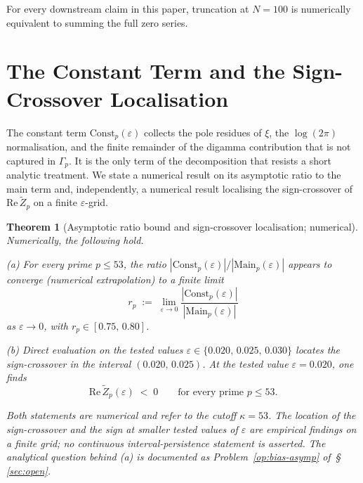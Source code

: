 \documentclass[11pt]{article}
\newtheorem{theorem}{Theorem}[section]
\newcommand{\Zt}{\widetilde{Z}}
\begin{document}
For every downstream claim in this paper, truncation at $N=100$ is
numerically equivalent to summing the full zero series.

\section{The Constant Term and the Sign-Crossover Localisation}
\label{sec:const}

The constant term $\mathrm{Const}_p(\varepsilon)$ collects the pole
residues of $\xi$, the $\log(2\pi)$ normalisation, and the finite
remainder of the digamma contribution that is not captured in
$\Gamma_p$.
It is the only term of the decomposition that resists a short analytic
treatment.
We state a numerical result on its asymptotic ratio to the main term
and, independently, a numerical result localising the sign-crossover
of $\mathrm{Re}\,\Zt_p$ on a finite $\varepsilon$-grid.

\begin{theorem}[Asymptotic ratio bound and sign-crossover localisation; numerical]
\label{thm:ratio-signcross}
Numerically, the following hold.

\emph{(a)} For every prime $p\le 53$, the ratio
$|\mathrm{Const}_p(\varepsilon)|/|\mathrm{Main}_p(\varepsilon)|$
appears to converge (numerical extrapolation) to a finite limit
\[
r_p \;:=\; \lim_{\varepsilon\to 0}
\frac{|\mathrm{Const}_p(\varepsilon)|}{|\mathrm{Main}_p(\varepsilon)|}
\]
as $\varepsilon\to 0$, with $r_p\in[0.75,\,0.80]$.

\emph{(b)} Direct evaluation on the tested values
$\varepsilon\in\{0.020,\,0.025,\,0.030\}$ locates the sign-crossover
in the interval $(0.020,\,0.025)$.
At the tested value $\varepsilon=0.020$, one finds
\[
\mathrm{Re}\,\Zt_p(\varepsilon) \;<\; 0 \qquad
\text{for every prime } p\le 53.
\]

Both statements are numerical and refer to the cutoff $\kappa=53$.
The location of the sign-crossover and the sign at smaller tested
values of $\varepsilon$ are empirical findings on a finite grid; no
continuous interval-persistence statement is asserted.
The analytical question behind (a) is documented as
Problem~\ref{op:bias-asymp} of~\S\,\ref{sec:open}.
\end{theorem}
\end{document}
